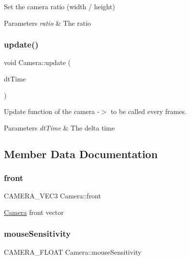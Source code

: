 Set the camera ratio (width / height) 


\begin{DoxyParams}{Parameters}
{\em ratio} & The ratio \\
\hline
\end{DoxyParams}
\mbox{\label{class_camera_ad1272976ffb7a0d535c8977ec063201d}} 
\subsubsection{\texorpdfstring{update()}{update()}}
{\footnotesize\ttfamily void Camera\+::update (\begin{DoxyParamCaption}\item[{float}]{dt\+Time }\end{DoxyParamCaption})}



Update function of the camera -\/$>$ to be called every frames. 


\begin{DoxyParams}{Parameters}
{\em dt\+Time} & The delta time \\
\hline
\end{DoxyParams}


\subsection{Member Data Documentation}
\mbox{\label{class_camera_ab4e78bcb515de19fbac48e3079dd7ccc}} 
\subsubsection{\texorpdfstring{front}{front}}
{\footnotesize\ttfamily C\+A\+M\+E\+R\+A\+\_\+\+V\+E\+C3 Camera\+::front}

\hyperlink{class_camera}{Camera} front vector \mbox{\label{class_camera_a0fd9adbe4484147947bc1f51452edd6f}} 
\subsubsection{\texorpdfstring{mouse\+Sensitivity}{mouseSensitivity}}
{\footnotesize\ttfamily C\+A\+M\+E\+R\+A\+\_\+\+F\+L\+O\+AT Camera\+::mouse\+Sensitivity}

